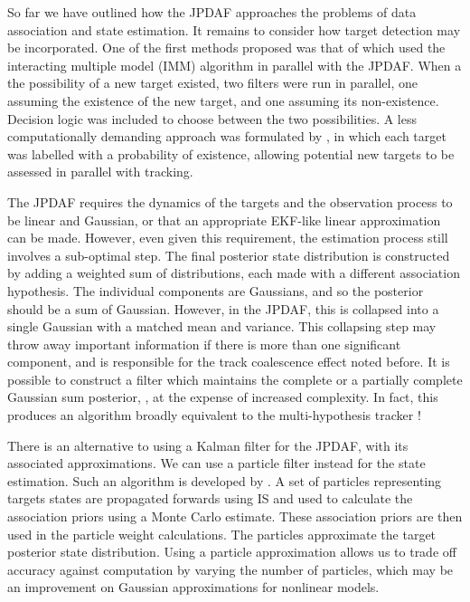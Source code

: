So far we have outlined how the JPDAF approaches the problems of data association and state estimation. It remains to consider how target detection may be incorporated. One of the first methods proposed was that of \cite{Bar-Shalom1989} which used the interacting multiple model (IMM) algorithm in parallel with the JPDAF. When a the possibility of a new target existed, two filters were run in parallel, one assuming the existence of the new target, and one assuming its non-existence. Decision logic was included to choose between the two possibilities. A less computationally demanding approach was formulated by \cite{Musicki1994,Musicki2004}, in which each target was labelled with a probability of existence, allowing potential new targets to be assessed in parallel with tracking.

The JPDAF requires the dynamics of the targets and the observation process to be linear and Gaussian, or that an appropriate EKF-like linear approximation can be made. However, even given this requirement, the estimation process still involves a sub-optimal step. The final posterior state distribution is constructed by adding a weighted sum of distributions, each made with a different association hypothesis. The individual components are Gaussians, and so the posterior should be a sum of Gaussian. However, in the JPDAF, this is collapsed into a single Gaussian with a matched mean and variance. This collapsing step may throw away important information if there is more than one significant component, and is responsible for the track coalescence effect noted before. It is possible to construct a filter which maintains the complete or a partially complete Gaussian sum posterior, \cite{Singer1974,Salmond1990}, at the expense of increased complexity. In fact, this produces an algorithm broadly equivalent to the multi-hypothesis tracker \cite{Blackman2004}!

There is an alternative to using a Kalman filter for the JPDAF, with its associated approximations. We can use a particle filter instead for the state estimation. Such an algorithm is developed by \cite{Schulz2001,Karlsson2001,Vermaak2005}. A set of particles representing targets states are propagated forwards using IS and used to calculate the association priors using a Monte Carlo estimate. These association priors are then used in the particle weight calculations. The particles approximate the target posterior state distribution. Using a particle approximation allows us to trade off accuracy against computation by varying the number of particles, which may be an improvement on Gaussian approximations for nonlinear models.

